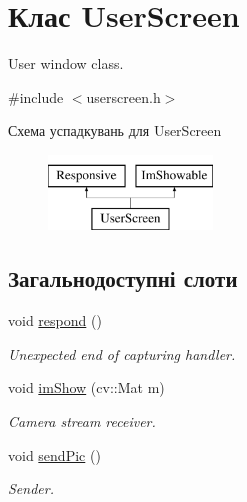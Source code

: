 \hypertarget{classUserScreen}{\section{Клас User\-Screen}
\label{classUserScreen}
}


User window class.  




{\ttfamily \#include $<$userscreen.\-h$>$}

Схема успадкувань для User\-Screen\begin{figure}[H]
\begin{center}
\leavevmode
\includegraphics[height=2.000000cm]{classUserScreen}
\end{center}
\end{figure}
\subsection*{Загальнодоступні слоти}
\begin{DoxyCompactItemize}
\item 
\hypertarget{classUserScreen_a89419eeb0d30311360c816f2a29355df}{void \hyperlink{classUserScreen_a89419eeb0d30311360c816f2a29355df}{respond} ()}\label{classUserScreen_a89419eeb0d30311360c816f2a29355df}

\begin{DoxyCompactList}\small\item\em Unexpected end of capturing handler. \end{DoxyCompactList}\item 
\hypertarget{classUserScreen_a960593e46a29dde2ebecde6bced1eaf9}{void \hyperlink{classUserScreen_a960593e46a29dde2ebecde6bced1eaf9}{im\-Show} (cv\-::\-Mat m)}\label{classUserScreen_a960593e46a29dde2ebecde6bced1eaf9}

\begin{DoxyCompactList}\small\item\em Camera stream receiver. \end{DoxyCompactList}\item 
\hypertarget{classUserScreen_af92e7e10b2690fe83a4f97f93ef1f910}{void \hyperlink{classUserScreen_af92e7e10b2690fe83a4f97f93ef1f910}{send\-Pic} ()}\label{classUserScreen_af92e7e10b2690fe83a4f97f93ef1f910}

\begin{DoxyCompactList}\small\item\em Sender. \end{DoxyCompactList}\end{DoxyCompactItemize}
